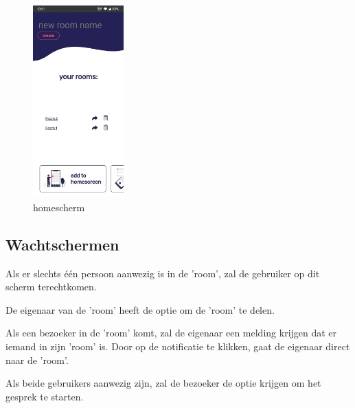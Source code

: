 			\begin{figure}[H]
				\centering
				\includegraphics[width=35mm]{./img/POC/home}{}		
				\caption{homescherm}
			\end{figure}
	
	\newpage
	\subsection{Wachtschermen}
		Als er slechts één persoon aanwezig is in de 'room', zal de gebruiker op dit scherm terechtkomen. 
		
		De eigenaar van de 'room' heeft de optie om de 'room' te delen. 
		
		Als een bezoeker in de 'room' komt, zal de eigenaar een melding krijgen dat er iemand in zijn 'room' is. Door op de notificatie te klikken, gaat de eigenaar direct naar de 'room'.
						
		Als beide gebruikers aanwezig zijn, zal de bezoeker de optie krijgen om het gesprek te starten.

